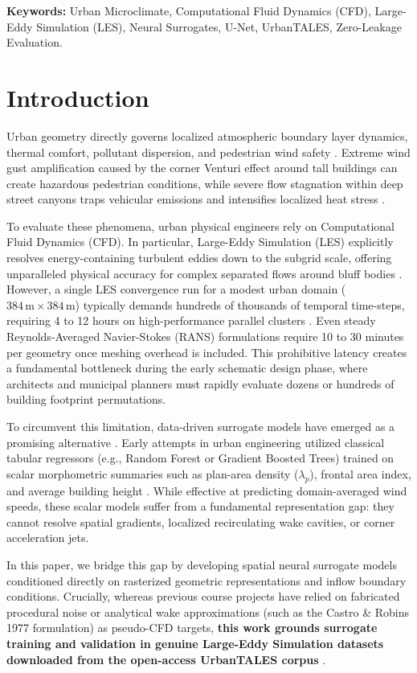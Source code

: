 \documentclass[10pt,twocolumn]{article}
\begin{document}
\noindent\textbf{Keywords:} Urban Microclimate, Computational Fluid Dynamics (CFD), Large-Eddy Simulation (LES), Neural Surrogates, U-Net, UrbanTALES, Zero-Leakage Evaluation.

\section{Introduction}
Urban geometry directly governs localized atmospheric boundary layer dynamics, thermal comfort, pollutant dispersion, and pedestrian wind safety \cite{oke1988street}. Extreme wind gust amplification caused by the corner Venturi effect around tall buildings can create hazardous pedestrian conditions, while severe flow stagnation within deep street canyons traps vehicular emissions and intensifies localized heat stress \cite{franke2007best}. 

To evaluate these phenomena, urban physical engineers rely on Computational Fluid Dynamics (CFD). In particular, Large-Eddy Simulation (LES) explicitly resolves energy-containing turbulent eddies down to the subgrid scale, offering unparalleled physical accuracy for complex separated flows around bluff bodies \cite{deardorff1970numerical}. However, a single LES convergence run for a modest urban domain ($384\,\text{m} \times 384\,\text{m}$) typically demands hundreds of thousands of temporal time-steps, requiring 4 to 12 hours on high-performance parallel clusters \cite{nazarian2025urbantales}. Even steady Reynolds-Averaged Navier-Stokes (RANS) formulations require 10 to 30 minutes per geometry once meshing overhead is included. This prohibitive latency creates a fundamental bottleneck during the early schematic design phase, where architects and municipal planners must rapidly evaluate dozens or hundreds of building footprint permutations.

To circumvent this limitation, data-driven surrogate models have emerged as a promising alternative \cite{brunton2020machine}. Early attempts in urban engineering utilized classical tabular regressors (e.g., Random Forest or Gradient Boosted Trees) trained on scalar morphometric summaries such as plan-area density ($\lambda_p$), frontal area index, and average building height \cite{alhafi2024machine}. While effective at predicting domain-averaged wind speeds, these scalar models suffer from a fundamental representation gap: they cannot resolve spatial gradients, localized recirculating wake cavities, or corner acceleration jets.

In this paper, we bridge this gap by developing spatial neural surrogate models conditioned directly on rasterized geometric representations and inflow boundary conditions. Crucially, whereas previous course projects have relied on fabricated procedural noise or analytical wake approximations (such as the Castro \& Robins 1977 formulation) as pseudo-CFD targets, \textbf{this work grounds surrogate training and validation in genuine Large-Eddy Simulation datasets downloaded from the open-access UrbanTALES corpus} \cite{nazarian2025urbantales}.
\end{document}
